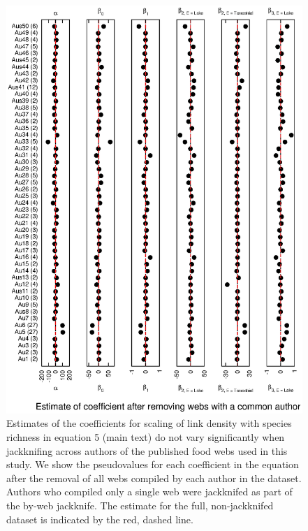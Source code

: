 \documentclass[12pt]{article}
\begin{document}
    \begin{figure}[!h]
    \centerline{\includegraphics*[height=.75\textheight]{Figures/Jackknife/LS_author.eps}}
    \caption{Estimates of the coefficients for scaling of link density with species richness
    in equation 5 (main text) do not vary significantly
    when jackknifing across authors of the published food webs used in this study. 
    We show the pseudovalues for each coefficient
    in the equation after the removal of all webs compiled by each author in the dataset. Authors
    who compiled only a single web were jackknifed as part of the by-web jackknife.
    The estimate for the full, non-jackknifed dataset is indicated by the red, dashed line.}
    \label{LS_web}
    \end{figure}

\newpage
\end{document}
